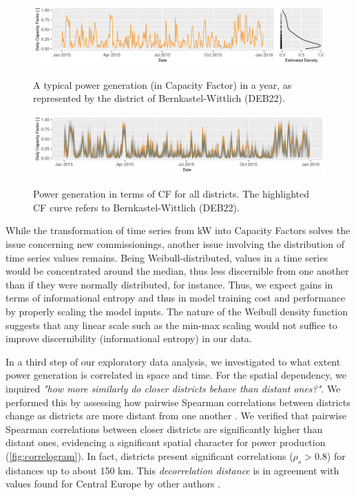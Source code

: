 \begin{figure}[H]%
	\centering
    \caption{A typical power generation (in Capacity Factor) in a year, as represented by the district of Bernkastel-Wittlich (DEB22).}
    \includegraphics[width=\textwidth]{wpg-cf-daily-typical-ts_20200703_075319}
	\label{fig:deb22_production_2015_cf}
\end{figure}

\begin{figure}[H]%
	\centering
    \caption{Power generation in terms of CF for all districts. The highlighted CF curve refers to Bernkastel-Wittlich (DEB22).}
    \includegraphics[width=\textwidth]{wpg-cf-daily-all-ts_20200701_163815_fav}
	\label{fig:all_cf}
\end{figure}

While the transformation of time series from kW into Capacity Factors solves the issue concerning new commissionings, another issue involving the distribution of time series values remains.
Being Weibull-distributed, values in a time series would be concentrated around the median, thus less discernible from one another than if they were normally distributed, for instance.
Thus, we expect gains in terms of informational entropy and thus in model training cost and performance by properly scaling the model inputs.
The nature of the Weibull density function suggests that any linear scale such as the min-max scaling would not suffice to improve discernibility (informational entropy) in our data.

In a third step of our exploratory data analysis, we investigated to what extent power generation is correlated in space and time.
For the spatial dependency, we inquired \textit{"how more similarly do closer districts behave than distant ones?"}.
We performed this by assessing how pairwise Spearman correlations between districts change as districts are more distant from one another \cite{engeland2017variability}.
We verified that pairwise Spearman correlations between closer districts are significantly higher than distant ones, evidencing a significant spatial character for power production (\ref{fig:correlogram}).
In fact, districts present significant correlations ($\rho_s>0.8$) for distances up to about 150 km.
This \textit{decorrelation distance} is in agreement with values found for Central Europe by other authors \cite{engeland2017variability}.

